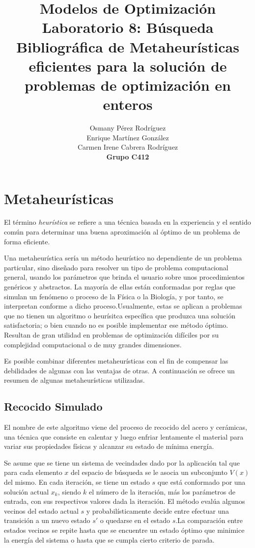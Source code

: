 \documentclass[titlepage, 11pt]{scrartcl}
\title{
    \normalfont\normalsize
    {\huge Modelos de Optimización\\
    		\textbf{Laboratorio 8:}  Búsqueda Bibliográfica de Metaheurísticas eficientes para 
    		la solución de problemas de optimización en enteros
}
    \vspace{12pt}
}
\author{Osmany P\'erez Rodr\'iguez\\
		Enrique Mart\'inez Gonz\'alez\\
		Carmen Irene Cabrera Rodr\'iguez\\
		\textbf{Grupo C412}}
\date{}
\begin{document}
    \maketitle 
    
    \section{Metaheurísticas}
		El término \textit{heurística} se refiere a una técnica basada en la experiencia y el sentido común para determinar una buena aproximación al óptimo de un problema de forma eficiente.
		
		Una metaheurística sería un método heurístico no dependiente de un problema particular, sino diseñado para resolver un tipo de problema computacional general, usando los parámetros que brinda el usuario sobre unos procedimientos genéricos y abstractos. La mayoría de ellas están conformadas por reglas que simulan un fenómeno o proceso de la Física o la Biología, y por tanto, se interpretan conforme a dicho proceso.Usualmente, estas se aplican a problemas que no tienen un algoritmo o heurísitca específica que produzca una solución satisfactoria; o bien cuando no es posible implementar ese método óptimo. Resultan de gran utilidad en problemas de optimización difíciles por su complejidad computacional o de muy grandes dimensiones.
		
		Es posible combinar diferentes metaheurísticas con el fin de compensar las debilidades de algunas con las ventajas de otras. A continuación se ofrece un resumen de algunas metaheurísticas utilizadas.

	    \subsection{Recocido Simulado}
	    	El nombre de este algoritmo viene del proceso de recocido del acero y cerámicas, una técnica que consiste en calentar y luego enfriar lentamente el material para variar sus propiedades físicas y alcanzar su estado de mínima energía.
	    	
	    	Se asume que se tiene un sistema de vecindades dado por la aplicación tal que para cada elemento $x$ del espacio de búsqueda se le asocia un subconjunto $V(x)$ del mismo. 
	    	En cada iteración, se tiene un estado $s$ que está conformado por una solución actual $x_k$, siendo $k$ el número de la iteración, más los parámetros de entrada, con sus respectivos valores dada la iteración. El método evalúa algunos vecinos del estado actual $s$ y probabilísticamente decide entre efectuar una transición a un nuevo estado $s'$ o quedarse en el estado $s$.La comparación entre estados vecinos se repite hasta que se encuentre un estado óptimo que minimice la energía del sistema o hasta que se cumpla cierto criterio de parada.
	    	
\end{document}
